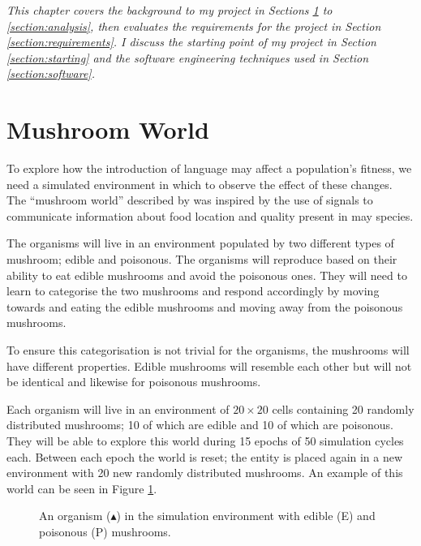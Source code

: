 \documentclass[12pt,a4paper,twoside,openright]{report}
\begin{document}
\emph{This chapter covers the background to my project in Sections \ref{section:world} to \ref{section:analysis}, then evaluates the requirements for the project in Section \ref{section:requirements}. I discuss the starting point of my project in Section \ref{section:starting} and the software engineering techniques used in Section \ref{section:software}.}

\section{Mushroom World}\label{section:world}

To explore how the introduction of language may affect a population's fitness, we need a simulated environment in which to observe the effect of these changes. The ``mushroom world'' described by \cite{Cangelosi1998} was inspired by the use of signals to communicate information about food location and quality present in may species.

The organisms will live in an environment populated by two different types of mushroom; edible and poisonous. The organisms will reproduce based on their ability to eat edible mushrooms and avoid the poisonous ones. They will need to learn to categorise the two mushrooms and respond accordingly by moving towards and eating the edible mushrooms and moving away from the poisonous mushrooms.

To ensure this categorisation is not trivial for the organisms, the mushrooms will have different properties. Edible mushrooms will resemble each other but will not be identical and likewise for poisonous mushrooms.

Each organism will live in an environment of $20 \times 20$ cells containing 20 randomly distributed mushrooms; 10 of which are edible and 10 of which are poisonous. They will be able to explore this world during 15 epochs of 50 simulation cycles each. Between each epoch the world is reset; the entity is placed again in a new environment with 20 new randomly distributed mushrooms. An example of this world can be seen in Figure \ref{fig:environment}.

\begin{figure}[h]
\centering
{}
\caption{An organism ($\blacktriangle$) in the simulation environment with edible (E) and poisonous (P) mushrooms.}
\label{fig:environment}
\end{figure}
\end{document}
